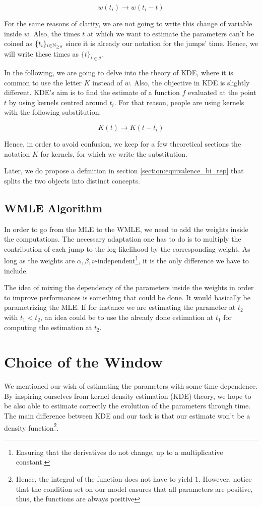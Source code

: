 \documentclass[11pt]{book}
\newcommand{\sequence}[1]{\{ #1 \}_{ i \in \N} }
\newcommand{\sequencetime}{\{t\}_{t \in \mathcal I} }
\begin{document}
$$w(t_i) \to w(  t_i - t ) $$

For the same reasons of clarity, we are not going to write this change of variable inside $w$. Also, the times $t$ at which we want to estimate the parameters can't be coined as $\sequence{t_i}$ since it is already our notation for the jumps' time. Hence, we will write these times as $\sequencetime$.

In the following, we are going to delve into the theory of KDE, where it is common to use the letter $K$ instead of $w$. Also, the objective in KDE is slightly different. KDE's aim is to find the estimate of a function $f$ evaluated at the point $t$ by using kernels centred around $t_i$. For that reason, people are using kernels with the following substitution:

$$ K(t) \to K(t - t_i)$$

Hence, in order to avoid confusion, we keep for a few theoretical sections the notation $K$ for kernels, for which we write the substitution. 

Later, we do propose a definition in section \ref{section:equivalence_bi_rep} that splits the two objects into distinct concepts.


\subsection{WMLE Algorithm}
In order to go from the MLE to the WMLE, we need to add the weights inside the computations. The necessary adaptation one has to do is to multiply the contribution of each jump to the log-likelihood by the corresponding weight. As long as the weights are $\alpha, \beta, \nu$-independent\footnote{Ensuring that the derivatives do not change, up to a multiplicative constant.}, it is the only difference we have to include.  

The idea of mixing the dependency of the parameters inside the weights in order to improve performances is something that could be done. It would basically be parametrizing the MLE. If for instance we are estimating the parameter at $t_2$ with $t_1 < t_2$, an idea could be to use the already done estimation at $t_1$ for computing the estimation at $t_2$.



\section{Choice of the Window}

We mentioned our wish of estimating the parameters with some time-dependence. By inspiring ourselves from kernel density estimation (KDE) theory, we hope to be also able to estimate correctly the evolution of the parameters through time. The main difference between KDE and our task is that our estimate won't be a density function\footnote{Hence, the integral of the function does not have to yield $1$. However, notice that the condition set on our model ensures that all parameters are positive, thus, the functions are always positive}. 
\end{document}
